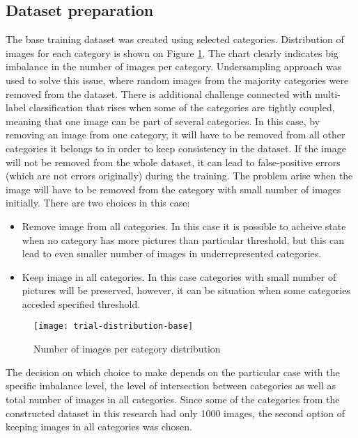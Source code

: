     \subsection{Dataset preparation}
    The base training dataset was created using selected categories. Distribution of images for each category is shown on Figure \ref{fig:trial-distribution-base}. The chart clearly indicates big imbalance in the number of images per category. Undersampling approach was used to solve this issue, where random images from the majority categories were removed from the dataset. There is additional challenge connected with multi-label classification that rises when some of the categories are tightly coupled, meaning that one image can be part of several categories. In this case, by removing an image from one category, it will have to be removed from all other categories it belongs to in order to keep consistency in the dataset. If the image will not be removed from the whole dataset, it can lead to false-positive errors (which are not errors originally) during the training. The problem arise when the image will have to be removed from the category with small number of images initially. There are two choices in this case:
    
    \begin{itemize}
        \item Remove image from all categories. In this case it is possible to acheive state when no category has more pictures than particular threshold, but this can lead to even smaller number of images in underrepresented categories.
        \item Keep image in all categories. In this case categories with small number of pictures will be preserved, however, it can be situation when some categories acceded specified threshold.
    \end{itemize}
    
    \begin{figure}[h!]
    \centering
    \texttt{[image: trial-distribution-base]}
    \caption{Number of images per category distribution}
    \label{fig:trial-distribution-base}
    \end{figure}
    
    The decision on which choice to make depends on the particular case with the specific imbalance level, the level of intersection between categories as well as total number of images in all categories. Since some of the categories from the constructed dataset in this research had only 1000 images, the second option of keeping images in all categories was chosen.
    
